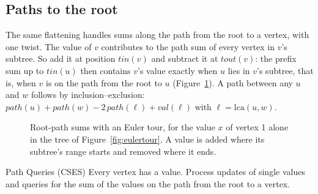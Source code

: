 \subsection{Paths to the root}

The same flattening handles sums along the path from the root to a vertex, with one twist. The value of $v$ contributes to the path
sum of every vertex in $v$'s subtree. So add it at position $\mathit{tin}(v)$ and subtract it at $\mathit{tout}(v)$: the prefix sum
up to $\mathit{tin}(u)$ then contains $v$'s value exactly when $u$ lies in $v$'s subtree, that is, when $v$ is on the path from the
root to $u$ (Figure~\ref{fig:pathsum}). A path between any $u$ and $w$ follows by inclusion--exclusion: $\mathit{path}(u) +
\mathit{path}(w) - 2\,\mathit{path}(\ell) + \mathit{val}(\ell)$ with $\ell = \mathrm{lca}(u, w)$.

\begin{figure}[htbp]
\centering
{}
\caption{Root-path sums with an Euler tour, for the value $x$ of vertex 1 alone in the tree of Figure~\ref{fig:eulertour}. A value
is added where its subtree's range starts and removed where it ends.}
\label{fig:pathsum}
\end{figure}

\begin{problem}{Path Queries (CSES)}
Every vertex has a value. Process updates of single values and queries for the sum of the values on the path from the root to a
vertex.
\end{problem}

